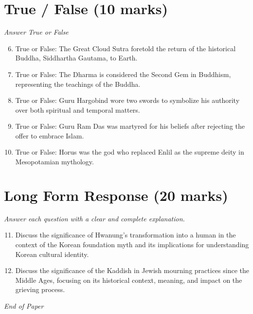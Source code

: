 \documentclass[12pt]{article}
\begin{document}
\section*{True / False (10 marks)}
\textit{Answer True or False}
\begin{enumerate}[label=\arabic*.]
\setcounter{enumi}{5}
\item True or False: The Great Cloud Sutra foretold the return of the historical Buddha, Siddhartha Gautama, to Earth.
\item True or False: The Dharma is considered the Second Gem in Buddhism, representing the teachings of the Buddha.
\item True or False: Guru Hargobind wore two swords to symbolize his authority over both spiritual and temporal matters.
\item True or False: Guru Ram Das was martyred for his beliefs after rejecting the offer to embrace Islam.
\item True or False: Horus was the god who replaced Enlil as the supreme deity in Mesopotamian mythology.
\end{enumerate}

\section*{Long Form Response (20 marks)}
\textit{Answer each question with a clear and complete explanation.}
\begin{enumerate}[label=\arabic*.]
\setcounter{enumi}{10}
\item Discuss the significance of Hwanung's transformation into a human in the context of the Korean foundation myth and its implications for understanding Korean cultural identity.
\item Discuss the significance of the Kaddish in Jewish mourning practices since the Middle Ages, focusing on its historical context, meaning, and impact on the grieving process.
\end{enumerate}

\vfill
\noindent\textit{End of Paper}
\end{document}

